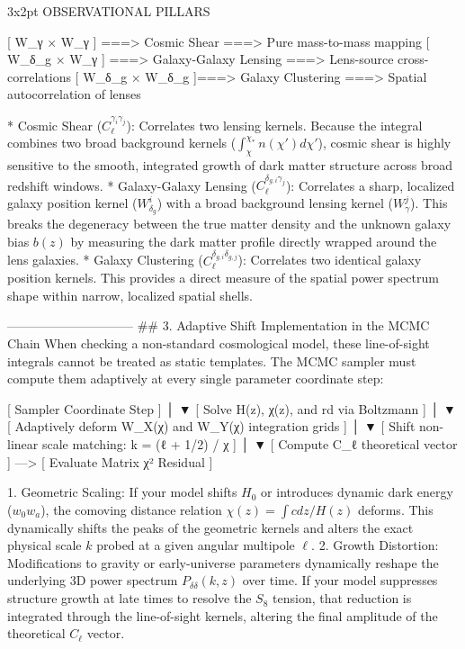                     3x2pt OBSERVATIONAL PILLARS
                    
  [ W_γ × W_γ ]  ===> Cosmic Shear            ===> Pure mass-to-mass mapping
  [ W_δ_g × W_γ ] ===> Galaxy-Galaxy Lensing   ===> Lens-source cross-correlations
  [ W_δ_g × W_δ_g ]===> Galaxy Clustering      ===> Spatial autocorrelation of lenses


* Cosmic Shear ($C_\ell^{\gamma_i \gamma_j}$): Correlates two lensing kernels. Because the integral combines two broad background kernels ($\int_\chi^{\chi_*} n(\chi')d\chi'$), cosmic shear is highly sensitive to the smooth, integrated growth of dark matter structure across broad redshift windows.
* Galaxy-Galaxy Lensing ($C_\ell^{\delta_{g,i} \gamma_j}$): Correlates a sharp, localized galaxy position kernel ($W_{\delta_g}^i$) with a broad background lensing kernel ($W_\gamma^j$). This breaks the degeneracy between the true matter density and the unknown galaxy bias $b(z)$ by measuring the dark matter profile directly wrapped around the lens galaxies.
* Galaxy Clustering ($C_\ell^{\delta_{g,i} \delta_{g,j}}$): Correlates two identical galaxy position kernels. This provides a direct measure of the spatial power spectrum shape within narrow, localized spatial shells.

------------------------------
## 3. Adaptive Shift Implementation in the MCMC Chain
When checking a non-standard cosmological model, these line-of-sight integrals cannot be treated as static templates. The MCMC sampler must compute them adaptively at every single parameter coordinate step:

  [ Sampler Coordinate Step ] 
             │
             ▼
  [ Solve H(z), χ(z), and rd via Boltzmann ] 
             │
             ▼
  [ Adaptively deform W_X(χ) and W_Y(χ) integration grids ] 
             │
             ▼
  [ Shift non-linear scale matching: k = (ℓ + 1/2) / χ ] 
             │
             ▼
  [ Compute C_ℓ theoretical vector ] ---> [ Evaluate Matrix χ² Residual ]


   1. Geometric Scaling: If your model shifts $H_0$ or introduces dynamic dark energy ($w_0 w_a$), the comoving distance relation $\chi(z) = \int c dz/H(z)$ deforms. This dynamically shifts the peaks of the geometric kernels and alters the exact physical scale $k$ probed at a given angular multipole $\ell$.
   2. Growth Distortion: Modifications to gravity or early-universe parameters dynamically reshape the underlying 3D power spectrum $P_{\delta \delta}(k, z)$ over time. If your model suppresses structure growth at late times to resolve the $S_8$ tension, that reduction is integrated through the line-of-sight kernels, altering the final amplitude of the theoretical $C_\ell$ vector.
